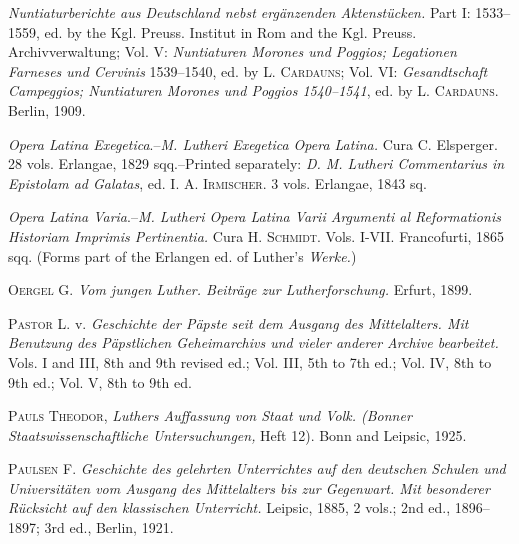 \textit{Nuntiaturberichte aus Deutschland nebst ergänzenden Aktenstücken.}
Part I: 1533--1559, ed. by the Kgl. Preuss. Institut in Rom and the Kgl. Preuss.
Archivverwaltung;
Vol. V: \textit{Nuntiaturen Morones und Poggios; Legationen Farneses und Cervinis} 1539--1540, ed. by \textsc{L. Cardauns};
Vol. VI: \textit{Gesandtschaft Campeggios; Nuntiaturen Morones und Poggios 1540--1541}, ed. by
\textsc{L. Cardauns}. Berlin, 1909.

\textit{Opera Latina Exegetica}.--\textit{M. Lutheri Exegetica Opera Latina.} Cura C. Elsperger.
28 vols. Erlangae, 1829 sqq.--Printed separately: \textit{D. M. Lutheri
Commentarius in Epistolam ad Galatas}, ed. \textsc{I. A. Irmischer.} 3 vols. Erlangae,
1843 sq.

\textit{Opera Latina Varia}.--\textit{M. Lutheri Opera Latina Varii Argumenti al Reformationis
Historiam Imprimis Pertinentia.} Cura \textsc{H. Schmidt.} Vols. I-VII.
Francofurti, 1865 sqq. (Forms part of the Erlangen ed. of Luther’s
\textit{Werke.})

\textsc{Oergel G.} \textit{Vom jungen Luther. Beiträge zur Lutherforschung.} Erfurt, 1899.

\textsc{Pastor L.} v. \textit{Geschichte der Päpste seit dem Ausgang des Mittelalters. Mit
Benutzung des Päpstlichen Geheimarchivs und vieler anderer Archive
bearbeitet.} Vols. I and III, 8th and 9th revised ed.; Vol. III, 5th to 7th ed.;
Vol. IV, 8th to 9th ed.; Vol. V, 8th to 9th ed.

\textsc{Pauls Theodor}, \textit{Luthers Auffassung von Staat und Volk. (Bonner Staatswissenschaftliche
Untersuchungen,} Heft 12). Bonn and Leipsic, 1925.

\textsc{Paulsen F.} \textit{Geschichte des gelehrten Unterrichtes auf den deutschen Schulen
und Universitäten vom Ausgang des Mittelalters bis zur Gegenwart. Mit
besonderer Rücksicht auf den klassischen Unterricht.} Leipsic, 1885, 2
vols.; 2nd ed., 1896--1897; 3rd ed., Berlin, 1921.

